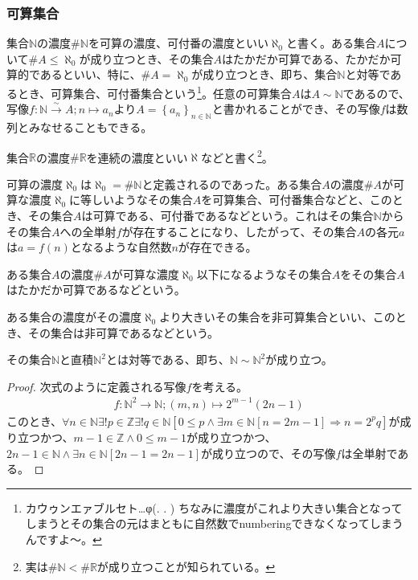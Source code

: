 \documentclass[dvipdfmx]{jsarticle}
\begin{document}
\subsubsection{可算集合}%
\begin{dfn}
集合$\mathbb{N}$の濃度$\# \mathbb{N}$を可算の濃度、可付番の濃度といい$\aleph_{0}$と書く。ある集合$A$について$\# A \leq \aleph_{0}$が成り立つとき、その集合$A$はたかだか可算である、たかだか可算的であるといい、特に、$\# A = \aleph_{0}$が成り立つとき、即ち、集合$\mathbb{N}$と対等であるとき、可算集合、可付番集合という\footnote{カウゥンエァブルセト…φ(. . ) ちなみに濃度がこれより大きい集合となってしまうとその集合の元はまともに自然数でnumberingできなくなってしまうんですよ～。}。任意の可算集合$A$は$A \sim \mathbb{N}$であるので、写像$f:\mathbb{N}\overset{\sim}{\rightarrow}A;n \mapsto a_{n}$より$A = \left\{ a_{n} \right\}_{n \in \mathbb{N}}$と書かれることができ、その写像$f$は数列とみなせることもできる。
\end{dfn}
\begin{dfn}
  集合$\mathbb{R}$の濃度$\# \mathbb{R}$を連続の濃度といい$\aleph$などと書く\footnote{実は$\# \mathbb{N} <\# \mathbb{R}$が成り立つことが知られている。}。
\end{dfn}
\begin{dfn}
  可算の濃度$\aleph_{0}$は$\aleph_{0} = \# \mathbb{N}$と定義されるのであった。ある集合$A$の濃度$\# A$が可算な濃度$\aleph_{0}$に等しいようなその集合$A$を可算集合、可付番集合などと、このとき、その集合$A$は可算である、可付番であるなどという。これはその集合$\mathbb{N}$からその集合$A$への全単射$f$が存在することになり、したがって、その集合$A$の各元$a$は$a = f(n)$となるような自然数$n$が存在できる。
\end{dfn}
\begin{dfn}
  ある集合$A$の濃度$\# A$が可算な濃度$\aleph_{0}$以下になるようなその集合$A$をその集合$A$はたかだか可算であるなどという。
\end{dfn}
\begin{dfn}
  ある集合の濃度がその濃度$\aleph_{0}$より大きいその集合を非可算集合といい、このとき、その集合は非可算であるなどという。
\end{dfn}  
\begin{thm}\label{1.2.7.4}
その集合$\mathbb{N} $と直積$\mathbb{N}^{2}$とは対等である、即ち、$\mathbb{N} \sim \mathbb{N}^{2}$が成り立つ。
\end{thm}
\begin{proof} 次式のように定義される写像$f$を考える。
\begin{align*}
f:\mathbb{N}^{2} \rightarrow \mathbb{N};(m,n) \mapsto 2^{m - 1}(2n - 1)
\end{align*}
このとき、$\forall n \in \mathbb{N}\exists!p \in \mathbb{Z}\exists!q \in \mathbb{N}\left[ 0 \leq p \land \exists m \in \mathbb{N}[ n = 2m - 1] \Rightarrow n = 2^{p}q \right]$が成り立つかつ、$m - 1 \in \mathbb{Z} \land 0 \leq m - 1$が成り立つかつ、$2n - 1 \in \mathbb{N} \land \exists n \in \mathbb{N}[ 2n - 1 = 2n - 1]$が成り立つので、その写像$f$は全単射である。
\end{proof}
\end{document}
